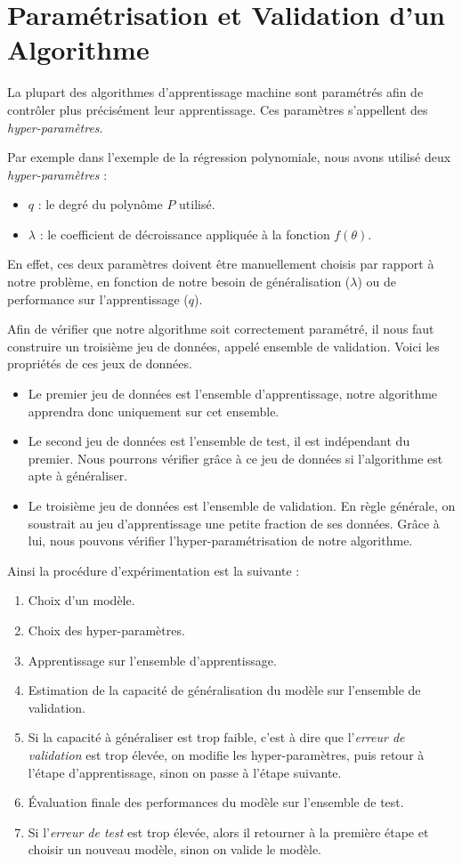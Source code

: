 \documentclass[a4paper, 10pt]{report}
\begin{document}
\section{Paramétrisation et Validation d'un Algorithme}
La plupart des algorithmes d'apprentissage machine sont paramétrés afin de contrôler plus précisément leur apprentissage.
Ces paramètres s'appellent des \emph{hyper-paramètres}.

Par exemple dans l'exemple de la régression polynomiale, nous avons utilisé deux \emph{hyper-paramètres} :
\begin{itemize}
	\item $q$ : le degré du polynôme $P$ utilisé.
	\item $\lambda$ : le coefficient de décroissance appliquée à la fonction $f(\theta)$.
\end{itemize}
En effet, ces deux paramètres doivent être manuellement choisis par rapport à notre problème, en fonction de notre besoin de généralisation ($\lambda$) ou de performance sur l'apprentissage ($q$).

Afin de vérifier que notre algorithme soit correctement paramétré, il nous faut construire un troisième jeu de données, appelé ensemble de validation.
Voici les propriétés de ces jeux de données.
\begin{itemize}
	\item Le premier jeu de données est l'ensemble d'apprentissage, notre algorithme apprendra donc uniquement sur cet ensemble.
	\item Le second jeu de données est l'ensemble de test, il est indépendant du premier. Nous pourrons vérifier grâce à ce jeu de données si l'algorithme est apte à généraliser.
	\item Le troisième jeu de données est l'ensemble de validation. En règle générale, on soustrait au jeu d'apprentissage une petite fraction de ses données. Grâce à lui, nous pouvons vérifier l'hyper-paramétrisation de notre algorithme.
\end{itemize}
Ainsi la procédure d'expérimentation est la suivante :
\begin{enumerate}
	\item Choix d'un modèle.
	\item Choix des hyper-paramètres.
	\item Apprentissage sur l'ensemble d'apprentissage.
	\item Estimation de la capacité de généralisation du modèle sur l'ensemble de validation.
	\item Si la capacité à généraliser est trop faible, c'est à dire que l'\emph{erreur de validation} est trop élevée, on modifie les hyper-paramètres, puis retour à l'étape d'apprentissage, sinon on passe à l'étape suivante.
	\item Évaluation finale des performances du modèle sur l'ensemble de test.
	\item Si l'\emph{erreur de test} est trop élevée, alors il retourner à la première étape et choisir un nouveau modèle, sinon on valide le modèle.
\end{enumerate}
	
\end{document}
